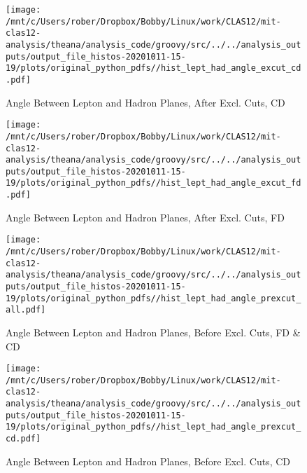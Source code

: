 \documentclass{article}
\begin{document}
\begin{landscape}
    \begin{figure}[h]
        \centering

        \texttt{[image: /mnt/c/Users/rober/Dropbox/Bobby/Linux/work/CLAS12/mit-clas12-analysis/theana/analysis\_code/groovy/src/../../analysis\_outputs/output\_file\_histos-20201011-15-19/plots/original\_python\_pdfs//hist\_lept\_had\_angle\_excut\_cd.pdf]}
        \captionsetup{textformat=empty,labelformat=blank}
        \caption{Angle Between Lepton and Hadron Planes, After Excl. Cuts, CD}
    \end{figure}
    \clearpage
    
    \begin{figure}[h]
        \centering

        \texttt{[image: /mnt/c/Users/rober/Dropbox/Bobby/Linux/work/CLAS12/mit-clas12-analysis/theana/analysis\_code/groovy/src/../../analysis\_outputs/output\_file\_histos-20201011-15-19/plots/original\_python\_pdfs//hist\_lept\_had\_angle\_excut\_fd.pdf]}
        \captionsetup{textformat=empty,labelformat=blank}
        \caption{Angle Between Lepton and Hadron Planes, After Excl. Cuts, FD}
    \end{figure}
    \clearpage
    
    \begin{figure}[h]
        \centering

        \texttt{[image: /mnt/c/Users/rober/Dropbox/Bobby/Linux/work/CLAS12/mit-clas12-analysis/theana/analysis\_code/groovy/src/../../analysis\_outputs/output\_file\_histos-20201011-15-19/plots/original\_python\_pdfs//hist\_lept\_had\_angle\_prexcut\_all.pdf]}
        \captionsetup{textformat=empty,labelformat=blank}
        \caption{Angle Between Lepton and Hadron Planes, Before Excl. Cuts, FD \& CD}
    \end{figure}
    \clearpage
    
    \begin{figure}[h]
        \centering

        \texttt{[image: /mnt/c/Users/rober/Dropbox/Bobby/Linux/work/CLAS12/mit-clas12-analysis/theana/analysis\_code/groovy/src/../../analysis\_outputs/output\_file\_histos-20201011-15-19/plots/original\_python\_pdfs//hist\_lept\_had\_angle\_prexcut\_cd.pdf]}
        \captionsetup{textformat=empty,labelformat=blank}
        \caption{Angle Between Lepton and Hadron Planes, Before Excl. Cuts, CD}
    \end{figure}
    \clearpage
    
    \begin{figure}[h]
        \centering


\end{figure}
\end{landscape}
\end{document}
